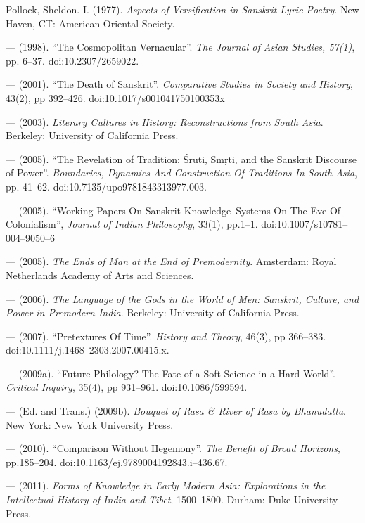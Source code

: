 \begin{thebibliography}{99}
  Pollock, Sheldon. I. (1977). \textit{Aspects of Versification in Sanskrit Lyric Poetry}. New Haven, CT: American Oriental Society.

  — (1998). “The Cosmopolitan Vernacular”. \textit{The Journal of Asian Studies, 57(1)}, pp. 6–37. doi:10.2307/2659022.

  — (2001). “The Death of Sanskrit”. \textit{Comparative Studies in Society and History}, 43(2), pp 392–426. doi:10.1017/s001041750100353x

  — (2003). \textit{Literary Cultures in History: Reconstructions from South Asia}. Berkeley: University of California Press.

  — (2005). “The Revelation of Tradition: Śruti, Smṛti, and the Sanskrit Discourse of Power”. \textit{Boundaries, Dynamics And Construction Of Traditions In South Asia}, pp. 41–62. doi:10.7135/upo9781843313977.003.

  — (2005). “Working Papers On Sanskrit Knowledge–Systems On The Eve Of Colonialism”, \textit{Journal of Indian Philosophy}, 33(1), pp.1–1. doi:10.1007/s10781–004–9050–6

  — (2005). \textit{The Ends of Man at the End of Premodernity}. Amsterdam: Royal Netherlands Academy of Arts and Sciences.

  — (2006). \textit{The Language of the Gods in the World of Men: Sanskrit, Culture, and Power in Premodern India}. Berkeley: University of California Press.

  — (2007). “Pretextures Of Time”. \textit{History and Theory}, 46(3), pp 366–383. doi:10.1111/j.1468–2303.2007.00415.x.

  — (2009a). “Future Philology? The Fate of a Soft Science in a Hard World”. \textit{Critical Inquiry}, 35(4), pp 931–961. doi:10.1086/599594.

  — (Ed. and Trans.) (2009b). \textit{Bouquet of Rasa \& River of Rasa by Bhanudatta}. New York: New York University Press.

  — (2010). “Comparison Without Hegemony”. \textit{The Benefit of Broad Horizons}, pp.185–204. doi:10.1163/ej.9789004192843.i–436.67.

  — (2011). \textit{Forms of Knowledge in Early Modern Asia: Explorations in the Intellectual History of India and Tibet}, 1500–1800. Durham: Duke University Press.


\end{thebibliography}
